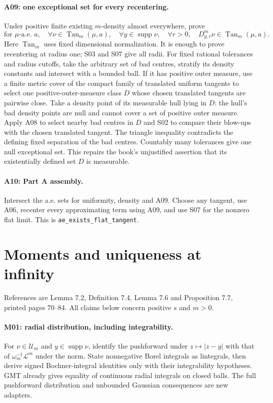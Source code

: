 \paragraph{A09: one exceptional set for every recentering.}
Under positive finite existing $m$-density almost everywhere, prove
\[
 \text{for }\mu\text{-a.e. }a,\quad
 \forall\nu\in\operatorname{Tan}_m(\mu,a),\quad
 \forall y\in\operatorname{supp}\nu,\quad\forall r>0,
 \quad D^m_{y,r}\nu\in\operatorname{Tan}_m(\mu,a).
\]
Here $\operatorname{Tan}_m$ uses fixed dimensional normalization.
It is enough to prove recentering at radius one; S03 and S07 give all radii.
For fixed rational tolerances and radius cutoffs, take the arbitrary set of
bad centres, stratify its density constants and intersect with a bounded ball.
If it has positive outer measure, use a finite metric cover of the compact
family of translated uniform tangents to select one positive-outer-measure
class $D$ whose chosen translated tangents are pairwise close.
Take a density point of its measurable hull lying in $D$: the hull's bad
density points are null and cannot cover a set of positive outer measure.
Apply A08 to select nearby bad centres in $D$ and S02 to compare their blow-ups
with the chosen translated tangent. The triangle inequality contradicts the
defining fixed separation of the bad centres. Countably many tolerances give
one null exceptional set. This repairs the book's unjustified assertion that
its existentially defined set $D$ is measurable.

\paragraph{A10: Part A assembly.}
Intersect the a.e. sets for uniformity, density and A09. Choose any tangent,
use A06, recenter every approximating term using A09, and use S07 for the
nonzero flat limit. This is \texttt{ae\_exists\_flat\_tangent}.

\section{Moments and uniqueness at infinity}
References are Lemma 7.2, Definition 7.4, Lemma 7.6 and Proposition 7.7,
printed pages 70--84. All claims below concern positive $s$ and $m>0$.

\paragraph{M01: radial distribution, including integrability.}
For $\nu\in\mathcal U_m$ and $y\in\operatorname{supp}\nu$, identify the
pushforward under $z\mapsto|z-y|$ with that of
$\omega_m^{-1}\mathcal L^m$ under the norm. State nonnegative Borel integrals
as lintegrals, then derive signed Bochner-integral identities only with their
integrability hypotheses. GMT already gives equality of continuous radial
integrals on closed balls. The full pushforward distribution and unbounded
Gaussian consequences are new adapters.

